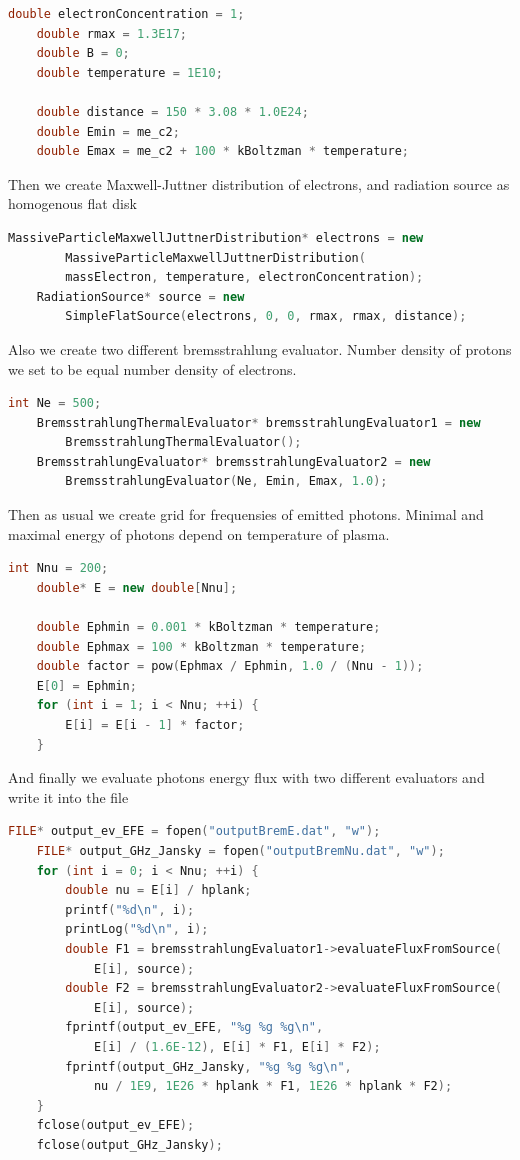 \begin{lstlisting}[language=c++]
    double electronConcentration = 1;
    double rmax = 1.3E17;
    double B = 0;
    double temperature = 1E10;
	
    double distance = 150 * 3.08 * 1.0E24;
    double Emin = me_c2;
    double Emax = me_c2 + 100 * kBoltzman * temperature;
\end{lstlisting}

Then we create Maxwell-Juttner distribution of electrons, and radiation source as homogenous flat disk

\begin{lstlisting}[language=c++]
    MassiveParticleMaxwellJuttnerDistribution* electrons = new 
        MassiveParticleMaxwellJuttnerDistribution( 
        massElectron, temperature, electronConcentration);
    RadiationSource* source = new 
        SimpleFlatSource(electrons, 0, 0, rmax, rmax, distance);
\end{lstlisting}

Also we create two different bremsstrahlung evaluator. Number density of protons we set to be equal number density of electrons.

\begin{lstlisting}[language=c++]
    int Ne = 500;
    BremsstrahlungThermalEvaluator* bremsstrahlungEvaluator1 = new
        BremsstrahlungThermalEvaluator();
    BremsstrahlungEvaluator* bremsstrahlungEvaluator2 = new
    	BremsstrahlungEvaluator(Ne, Emin, Emax, 1.0);
\end{lstlisting}

Then as usual we create grid for frequensies of emitted photons. Minimal and maximal energy of photons depend on temperature of plasma.

\begin{lstlisting}[language=c++]
    int Nnu = 200;
    double* E = new double[Nnu];

    double Ephmin = 0.001 * kBoltzman * temperature;
    double Ephmax = 100 * kBoltzman * temperature;
    double factor = pow(Ephmax / Ephmin, 1.0 / (Nnu - 1));
    E[0] = Ephmin;
    for (int i = 1; i < Nnu; ++i) {
        E[i] = E[i - 1] * factor;
    }	
\end{lstlisting}

And finally we evaluate photons energy flux with two different evaluators and write it into the file

\begin{lstlisting}[language=c++]
    FILE* output_ev_EFE = fopen("outputBremE.dat", "w");
    FILE* output_GHz_Jansky = fopen("outputBremNu.dat", "w");
    for (int i = 0; i < Nnu; ++i) {
        double nu = E[i] / hplank;
        printf("%d\n", i);
        printLog("%d\n", i);
        double F1 = bremsstrahlungEvaluator1->evaluateFluxFromSource(
            E[i], source);
        double F2 = bremsstrahlungEvaluator2->evaluateFluxFromSource(
            E[i], source);
        fprintf(output_ev_EFE, "%g %g %g\n",
            E[i] / (1.6E-12), E[i] * F1, E[i] * F2);
        fprintf(output_GHz_Jansky, "%g %g %g\n",
            nu / 1E9, 1E26 * hplank * F1, 1E26 * hplank * F2);
    }
    fclose(output_ev_EFE);
    fclose(output_GHz_Jansky);
\end{lstlisting}

